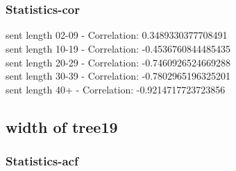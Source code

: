 \documentclass{article}%
\begin{document}
\begin{figure}[ht]%
\centering%
\setlength{\abovecaptionskip}{-35pt}%
%
%
\\%
%
%
\\%
%
\end{figure}

%
\newpage%
\subsubsection{Statistics{-}cor}%
\label{ssubsec:Statistics{-}cor}%
\noindent%
sent length 02-09 - Correlation: 0.3489330377708491\\%
sent length 10-19 - Correlation: -0.4536760844485435\\%
sent length 20-29 - Correlation: -0.7460926524669288\\%
sent length 30-39 - Correlation: -0.7802965196325201\\%
sent length 40+ - Correlation: -0.9214717723723856\\

%
\newpage

%
\subsection{width of tree19}%
\label{subsec:widthoftree19}%
\subsubsection{Statistics{-}acf}%
\label{ssubsec:Statistics{-}acf}%
\end{document}
